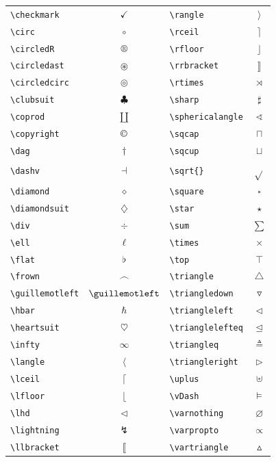 \begin{longtable}{lc|lc}
\verb+\checkmark+ & $\checkmark$ &\verb+\rangle+ & $\rangle$\\
\verb+\circ+ & $\circ$ &\verb+\rceil+ & $\rceil$\\
\verb+\circledR+ & $\circledR$ &\verb+\rfloor+ & $\rfloor$\\
\verb+\circledast+ & $\circledast$ &\verb+\rrbracket+ & $\rrbracket$\\
\verb+\circledcirc+ & $\circledcirc$ &\verb+\rtimes+ & $\rtimes$\\
\verb+\clubsuit+ & $\clubsuit$ &\verb+\sharp+ & $\sharp$\\
\verb+\coprod+ & $\coprod$ &\verb+\sphericalangle+ & $\sphericalangle$\\
\verb+\copyright+ & $\copyright$ &\verb+\sqcap+ & $\sqcap$\\
\verb+\dag+ & $\dag$ &\verb+\sqcup+ & $\sqcup$\\
\verb+\dashv+ & $\dashv$ &\verb+\sqrt{}+ & $\sqrt{}$\\
\verb+\diamond+ & $\diamond$ &\verb+\square+ & $\square$\\
\verb+\diamondsuit+ & $\diamondsuit$ &\verb+\star+ & $\star$\\
\verb+\div+ & $\div$ &\verb+\sum+ & $\sum$\\
\verb+\ell+ & $\ell$ &\verb+\times+ & $\times$\\
\verb+\flat+ & $\flat$ &\verb+\top+ & $\top$\\
\verb+\frown+ & $\frown$ &\verb+\triangle+ & $\triangle$\\
\verb+\guillemotleft+ & $\guillemotleft$ &\verb+\triangledown+ & $\triangledown$\\
\verb+\hbar+ & $\hbar$ &\verb+\triangleleft+ & $\triangleleft$\\
\verb+\heartsuit+ & $\heartsuit$ &\verb+\trianglelefteq+ & $\trianglelefteq$\\
\verb+\infty+ & $\infty$ &\verb+\triangleq+ & $\triangleq$\\
\verb+\langle+ & $\langle$ &\verb+\triangleright+ & $\triangleright$\\
\verb+\lceil+ & $\lceil$ &\verb+\uplus+ & $\uplus$\\
\verb+\lfloor+ & $\lfloor$ &\verb+\vDash+ & $\vDash$\\
\verb+\lhd+ & $\lhd$ &\verb+\varnothing+ & $\varnothing$\\
\verb+\lightning+ & $\lightning$ &\verb+\varpropto+ & $\varpropto$\\
\verb+\llbracket+ & $\llbracket$ &\verb+\vartriangle+ & $\vartriangle$\\

\end{longtable}
